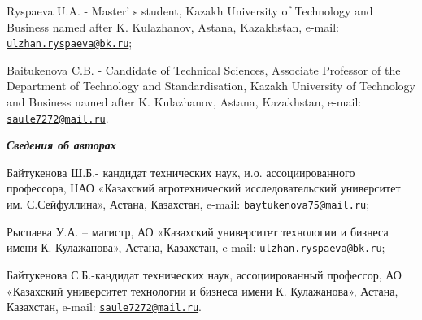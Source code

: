Ryspaeva U.A. - Master' s student, Kazakh University of
Technology and Business named after K. Kulazhanov, Astana, Kazakhstan,
e-mail:
\href{mailto:ulzhan.ryspaeva@bk.ru}{\nolinkurl{ulzhan.ryspaeva@bk.ru}};

Baitukenova C.B. - Candidate of Technical Sciences, Associate Professor
of the Department of Technology and Standardisation, Kazakh University
of Technology and Business named after K. Kulazhanov, Astana,
Kazakhstan, e-mail:
\href{mailto:saule7272@mail.ru}{\nolinkurl{saule7272@mail.ru}}.

\emph{{\bfseries Сведения об авторах}}

Байтукенова Ш.Б.- кандидат технических наук, и.о. ассоциированного
профессора, НАО «Казахский агротехнический исследовательский университет
им. С.Сейфуллина», Астана, Казахстан, e-mail:
\href{mailto:baytukenova75@mail.ru}{\nolinkurl{baytukenova75@mail.ru}};

Рыспаева У.А. -- магистр, АО «Казахский университет технологии и бизнеса
имени К. Кулажанова», Астана, Казахстан, e-mail:
\href{mailto:ulzhan.ryspaeva@bk.ru}{\nolinkurl{ulzhan.ryspaeva@bk.ru}};

Байтукенова С.Б.-кандидат технических наук, ассоциированный профессор,
АО «Казахский университет технологии и бизнеса имени К. Кулажанова»,
Астана, Казахстан, e-mail:
\href{mailto:saule7272@mail.ru}{\nolinkurl{saule7272@mail.ru}}.
